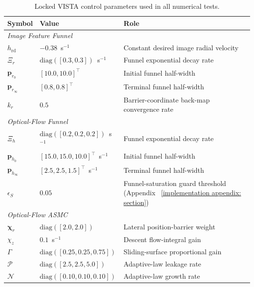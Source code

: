 \documentclass{IEEEtaes}
\theoremstyle{definition}
\theoremstyle{remark}
\begin{document}
\begin{table}[!t]
    \centering
    \footnotesize
    \caption{Locked VISTA control parameters used in all numerical tests.}
    \label{sup:control params}
    \begin{tabular}{p{} p{} p{}}
    \toprule
        \textbf{Symbol} & \textbf{Value} & \textbf{Role}\\
    \midrule
        \multicolumn{3}{l}{\textit{Image Feature Funnel}} \\
        $h_\text{rd}$ & $-0.38$~s$^{-1}$ & Constant desired image radial velocity \\
        $\Xi_r$                     & $\text{diag}([0.3,0.3])$~s$^{-1}$ & Funnel exponential decay rate \\
        $\boldsymbol{p}_{r_0}$      & $[10.0,10.0]^\top$ & Initial funnel half-width \\
        $\boldsymbol{p}_{r_\infty}$ & $[0.8,0.8]^\top$ & Terminal funnel half-width \\
        $k_r$                       & $0.5$ & Barrier-coordinate back-map convergence rate \\
    \midrule
        \multicolumn{3}{l}{\textit{Optical-Flow Funnel}} \\
        $\Xi_h$                     & $\text{diag}([0.2,0.2,0.2])$~s$^{-1}$ & Funnel exponential decay rate \\
        $\boldsymbol{p}_{h_0}$      & $[15.0,15.0,10.0]^\top$~s$^{-1}$ & Initial funnel half-width \\
        $\boldsymbol{p}_{h_\infty}$ & $[2.5,2.5,1.5]^\top$~s$^{-1}$ & Terminal funnel half-width \\
        $\epsilon_S$                & $0.05$ & Funnel-saturation guard threshold (Appendix~
\ref{implementation appendix: section}) \\
    \midrule
        \multicolumn{3}{l}{\textit{Optical-Flow ASMC}} \\
        $\boldsymbol{\chi}_r$   & $\text{diag}([2.0,2.0])$ & Lateral position-barrier weight \\
        $\chi_z$                & $0.1$~s$^{-1}$ & Descent flow-integral gain \\
        $\Gamma$                & $\text{diag}([0.25,0.25,0.75])$ & Sliding-surface proportional gain \\
        $\mathcal{P}$           & $\text{diag}([2.5,2.5,5.0])$ & Adaptive-law leakage rate \\
        $\mathcal{N}$           & $\text{diag}([0.10,0.10,0.10])$ & Adaptive-law growth rate \\

\end{tabular}
\end{table}
\end{document}
